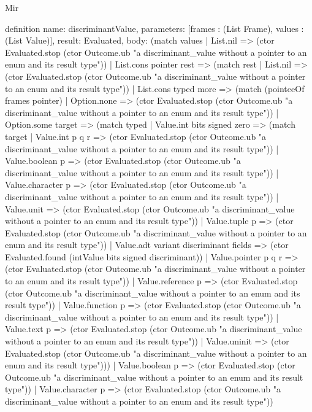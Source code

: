 \begin{lexlean}{Mir}
\begin{semanticmodule}
definition{
  name: discriminantValue,
  parameters: [frames : (List Frame), values : (List Value)],
  result: Evaluated,
  body: (match values
    | List.nil => (ctor Evaluated.stop (ctor Outcome.ub "a discriminant_value without a pointer to an enum and its result type"))
    | List.cons pointer rest => (match rest
      | List.nil => (ctor Evaluated.stop (ctor Outcome.ub "a discriminant_value without a pointer to an enum and its result type"))
      | List.cons typed more => (match (pointeeOf frames pointer)
        | Option.none => (ctor Evaluated.stop (ctor Outcome.ub "a discriminant_value without a pointer to an enum and its result type"))
        | Option.some target => (match typed
          | Value.int bits signed zero => (match target
            | Value.int p q r => (ctor Evaluated.stop (ctor Outcome.ub "a discriminant_value without a pointer to an enum and its result type"))
            | Value.boolean p => (ctor Evaluated.stop (ctor Outcome.ub "a discriminant_value without a pointer to an enum and its result type"))
            | Value.character p => (ctor Evaluated.stop (ctor Outcome.ub "a discriminant_value without a pointer to an enum and its result type"))
            | Value.unit => (ctor Evaluated.stop (ctor Outcome.ub "a discriminant_value without a pointer to an enum and its result type"))
            | Value.tuple p => (ctor Evaluated.stop (ctor Outcome.ub "a discriminant_value without a pointer to an enum and its result type"))
            | Value.adt variant discriminant fields => (ctor Evaluated.found (intValue bits signed discriminant))
            | Value.pointer p q r => (ctor Evaluated.stop (ctor Outcome.ub "a discriminant_value without a pointer to an enum and its result type"))
            | Value.reference p => (ctor Evaluated.stop (ctor Outcome.ub "a discriminant_value without a pointer to an enum and its result type"))
            | Value.function p => (ctor Evaluated.stop (ctor Outcome.ub "a discriminant_value without a pointer to an enum and its result type"))
            | Value.text p => (ctor Evaluated.stop (ctor Outcome.ub "a discriminant_value without a pointer to an enum and its result type"))
            | Value.uninit => (ctor Evaluated.stop (ctor Outcome.ub "a discriminant_value without a pointer to an enum and its result type")))
          | Value.boolean p => (ctor Evaluated.stop (ctor Outcome.ub "a discriminant_value without a pointer to an enum and its result type"))
          | Value.character p => (ctor Evaluated.stop (ctor Outcome.ub "a discriminant_value without a pointer to an enum and its result type"))
}
\end{semanticmodule}
\end{lexlean}

